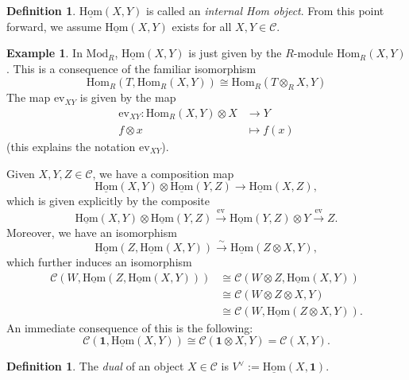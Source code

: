 \documentclass[10pt]{amsart}
\numberwithin{equation}{section}
\def\~#1{\mathscr{#1}}
\def\To#1{\xrightarrow{#1}}
\newcommand{\isom}{\xrightarrow{\sim}}
\newcommand{\ev}{\mathrm{ev}}
\newcommand{\Hom}{\mathrm{Hom}}
\newcommand{\iHom}{\underline{\Hom}}
\newcommand{\Mod}{\mathrm{Mod}}
\theoremstyle{plain}
\theoremstyle{definition}
\newtheorem{defn}[thm]{Definition}
\newtheorem{ex}[thm]{Example}
\theoremstyle{remark}
\begin{document}
\begin{defn}
    $\underline{\Hom}(X, Y)$ is called an \emph{internal Hom object}. From this point forward, we assume $\underline{\Hom}(X, Y)$ exists for all $X, Y \in \~C$.
\end{defn}

\begin{ex}
    In $\Mod_R$, $\underline{\Hom}(X, Y)$ is just given by the $R$-module $\Hom_R(X, Y)$. This is a consequence of the familiar isomorphism
    \[\Hom_R(T, \Hom_R(X, Y)) \cong \Hom_R(T \otimes_R X, Y)\]
    The map $\ev_{XY}$ is given by the map
    \begin{align*}
        \ev_{XY}: \Hom_R(X, Y) \otimes X &\to Y \\ 
        f \otimes x &\mapsto f(x)
    \end{align*} 
    (this explains the notation $\ev_{XY}$).
\end{ex}

Given $X, Y, Z \in \~C$, we have a composition map
\[\underline{\Hom}(X, Y) \otimes \underline{\Hom}(Y, Z) \to \underline{\Hom}(X,Z),\]
which is given explicitly by the composite
\[\iHom(X, Y) \otimes \iHom(Y, Z) \To{\ev} \iHom(Y, Z) \otimes Y \To{\ev} Z.\]
Moreover, we have an isomorphism
\begin{equation}
    \iHom(Z, \iHom(X,Y)) \isom \iHom(Z \otimes X, Y),
\end{equation}
which further induces an isomorphism
\begin{align*}
    \~C(W, \iHom(Z, \iHom(X, Y))) &\cong \~C(W \otimes Z, \iHom(X, Y)) \\ 
                                  &\cong \~C(W \otimes Z \otimes X, Y) \\ 
                                  &\cong \~C(W, \iHom(Z \otimes X, Y)).
\end{align*}
An immediate consequence of this is the following:
\begin{equation}
    \~C(\mathbf{1}, \iHom(X, Y)) \cong \~C(\textbf{1} \otimes X, Y) = \~C(X, Y).
\end{equation}

\begin{defn}
    The \emph{dual} of an object $X\in \~C$ is $V^\vee := \iHom(X, \mathbf{1})$. 
\end{defn}
\end{document}
